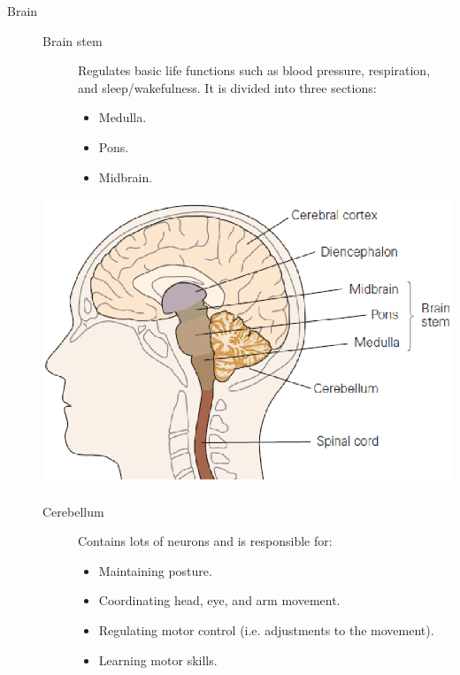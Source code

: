\begin{description}
    \item[Brain] 
    
    \begin{minipage}{0.6\textwidth}
        \begin{description}
            \item[Brain stem] 
                Regulates basic life functions such as blood pressure, respiration, and sleep/wakefulness.
                It is divided into three sections:
                \begin{itemize}
                    \item Medulla.
                    \item Pons.
                    \item Midbrain.
                \end{itemize}
        \end{description}
    \end{minipage}
    \begin{minipage}{0.35\textwidth}
        \centering
        \includegraphics[width=\linewidth]{./img/brain_sections.png}
    \end{minipage}

    \begin{description}
        \item[Cerebellum] 
            Contains lots of neurons and is responsible for:
            \begin{itemize}
                \item Maintaining posture.
                \item Coordinating head, eye, and arm movement.
                \item Regulating motor control (i.e. adjustments to the movement).
                \item Learning motor skills.
            \end{itemize}


\end{description}
\end{description}
